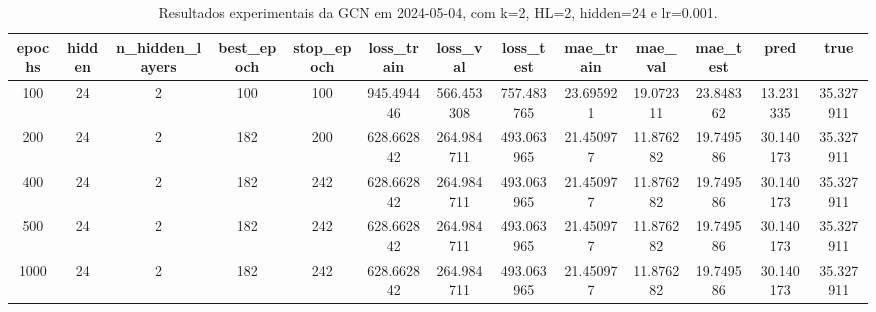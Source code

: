 \begin{table}[h]
\centering
\caption{Resultados experimentais da GCN em 2024-05-04, com k=2, HL=2, hidden=24 e lr=0.001.}
\label{tab:gcn_results_k2_hl2_h24_d20240504}
\begin{tabular}{ccccccccccccc}
\toprule
epochs & hidden & n\_hidden\_layers & best\_epoch & stop\_epoch & loss\_train & loss\_val & loss\_test & mae\_train & mae\_val & mae\_test & pred & true \\
\midrule
100 & 24 & 2 & 100 & 100 & 945.494446 & 566.453308 & 757.483765 & 23.695921 & 19.072311 & 23.848362 & 13.231335 & 35.327911 \\
200 & 24 & 2 & 182 & 200 & 628.662842 & 264.984711 & 493.063965 & 21.450977 & 11.876282 & 19.749586 & 30.140173 & 35.327911 \\
400 & 24 & 2 & 182 & 242 & 628.662842 & 264.984711 & 493.063965 & 21.450977 & 11.876282 & 19.749586 & 30.140173 & 35.327911 \\
500 & 24 & 2 & 182 & 242 & 628.662842 & 264.984711 & 493.063965 & 21.450977 & 11.876282 & 19.749586 & 30.140173 & 35.327911 \\
1000 & 24 & 2 & 182 & 242 & 628.662842 & 264.984711 & 493.063965 & 21.450977 & 11.876282 & 19.749586 & 30.140173 & 35.327911 \\
\bottomrule
\end{tabular}
\end{table}
